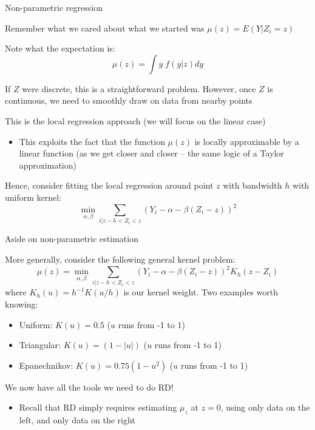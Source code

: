 \documentclass[notes,11pt, aspectratio=169]{beamer}
\newenvironment{wideitemize}{\itemize\addtolength{\itemsep}{10pt}}{\enditemize}
\begin{document}
\begin{frame}{Non-parametric regression}
  \begin{wideitemize}
  \item   Remember what we cared about what we started was $\mu(z) = E(Y| Z_{i} = z)$
  \item   Note what the expectation is:
  \begin{equation*}
    \mu(z) = \int y \; f(y | z) dy
  \end{equation*}
\item If $Z$ were discrete, this is a straightforward
  problem. However, once $Z$ is continuous, we need to smoothly draw
  on data from nearby points
\item This is the local regression approach (we will focus on the linear case)
  \begin{itemize}
  \item This exploits the fact that the function $\mu(z)$ is locally
    approximable by a linear function (as we get closer and closer --
    the same logic of a Taylor approximation)
  \end{itemize}
\item Hence, consider fitting the local regression around point $z$ with bandwidth $h$ with uniform kernel:
  \begin{equation}
    \min_{\alpha, \beta}\sum_{i | z-h < Z_{i} < z} (Y_{i} - \alpha - \beta (Z_{i} - z))^{2}
  \end{equation}
  \end{wideitemize}
\end{frame}


\begin{frame}{Aside on non-parametric estimation}
  \begin{wideitemize}
  \item More generally, consider the following general kernel problem:
    \begin{equation}
      \hat{\mu}(z) = \min_{\alpha, \beta}\sum_{i | z-h < Z_{i} < z} (Y_{i} - \alpha - \beta (Z_{i} - z))^{2} K_{h}(z - Z_{i})
    \end{equation}
    where $K_{h}(u) = h^{-1} K(u/h)$ is our kernel weight. Two examples worth knowing:
    \begin{itemize}
    \item Uniform: $K(u) = 0.5$ ($u$ runs from -1 to 1)
    \item Triangular: $K(u) = (1-|u|)$ ($u$ runs from -1 to 1)
    \item Epanechnikov: $K(u) = 0.75(1-u^{2})$ ($u$ runs from -1 to 1)    
    \end{itemize}
\item We now have all the tools we need to do RD!
  \begin{itemize}
  \item Recall that RD simply requires estimating $\mu_{z}$ at
    $z = 0$, using only data on the left, and only data on the right
  \end{itemize}
  \end{wideitemize}
  
\end{frame}
\end{document}
